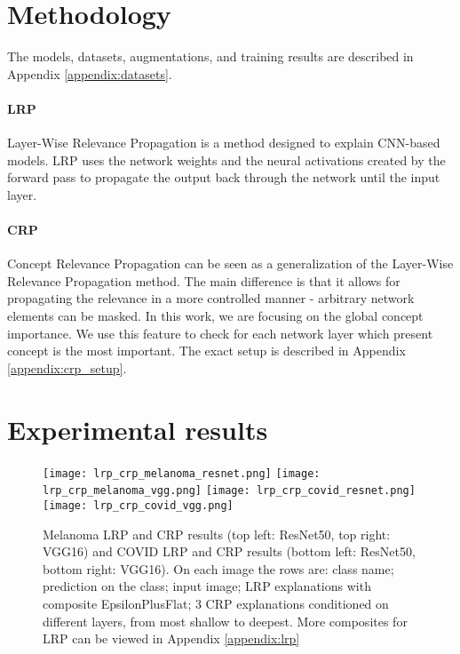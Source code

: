 \documentclass[twoside,11pt]{article}
\begin{document}
\section{Methodology}
The models, datasets, augmentations, and training results are described in Appendix \ref{appendix:datasets}.

\paragraph{LRP}
Layer-Wise Relevance Propagation \citep{Montavon2019} is a method designed to explain CNN-based models.
LRP uses the network weights and the neural activations created by the forward pass to propagate the output back through the network until the input layer.

\paragraph{CRP}
Concept Relevance Propagation \citep{https://doi.org/10.48550/arxiv.2206.03208} can be seen as a generalization of the Layer-Wise Relevance Propagation method. The main difference is that it allows for propagating the relevance in a more controlled manner - arbitrary network elements can be masked. In this work, we are focusing on the global concept importance. We use this feature to check for each network layer which present concept is the most important. The exact setup is described in Appendix \ref{appendix:crp_setup}.




\section{Experimental results}
\begin{figure}[t]
    \centering
    \texttt{[image: lrp\_crp\_melanoma\_resnet.png]}
    \texttt{[image: lrp\_crp\_melanoma\_vgg.png]}
    \texttt{[image: lrp\_crp\_covid\_resnet.png]}
    \texttt{[image: lrp\_crp\_covid\_vgg.png]}
    \caption{
    Melanoma LRP and CRP results (top left: ResNet50, top right: VGG16) and COVID LRP and CRP results (bottom left: ResNet50, bottom right: VGG16).
    On each image the rows are: class name; prediction on the class; input image; LRP explanations with composite EpsilonPlusFlat; 3 CRP explanations conditioned on different layers, from most shallow to deepest.
    More composites for LRP can be viewed in Appendix \ref{appendix:lrp}
    }
    \label{fig:lrp}
\end{figure}
\end{document}
